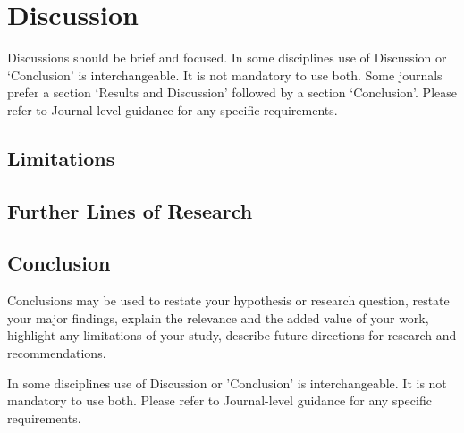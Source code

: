 \documentclass[sn-mathphys, Numbered]{sn-jnl}%
\theoremstyle{thmstyleone}%
\theoremstyle{thmstyletwo}%
\theoremstyle{thmstylethree}%
\begin{document}
\section{Discussion}\label{Discussion}

Discussions should be brief and focused. In some disciplines use of Discussion or `Conclusion' is interchangeable. It is not mandatory to use both. Some journals prefer a section `Results and Discussion' followed by a section `Conclusion'. Please refer to Journal-level guidance for any specific requirements. 


\subsection{Limitations}\label{Limitations}

\subsection{Further Lines of Research}\label{Further Lines of Research}

\subsection{Conclusion}\label{Conclusion}

Conclusions may be used to restate your hypothesis or research question, restate your major findings, explain the relevance and the added value of your work, highlight any limitations of your study, describe future directions for research and recommendations. 

In some disciplines use of Discussion or 'Conclusion' is interchangeable. It is not mandatory to use both. Please refer to Journal-level guidance for any specific requirements. 


\printbibliography
\end{document}
